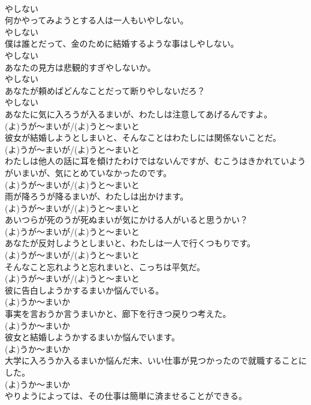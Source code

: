 \documentclass[8pt]{extreport}
\begin{document}
\begin{CJK}{UTF8}{min}
\\	やしない
\\	何かやってみようとする人は一人もいやしない。	
\\	やしない
\\	僕は誰とだって、金のために結婚するような事はしやしない。	
\\	やしない
\\	あなたの見方は悲観的すぎやしないか。	
\\	やしない
\\	あなたが頼めばどんなことだって断りやしないだろ？	
\\	やしない
\\	あなたに気に入ろうが入るまいが、わたしは注意してあげるんですよ。	
\\	(よ)うが～まいが/(よ)うと～まいと
\\	彼女が結婚しようとしまいと、そんなことはわたしには関係ないことだ。	
\\	(よ)うが～まいが/(よ)うと～まいと
\\	わたしは他人の話に耳を傾けたわけではないんですが、むこうはきかれていようがいまいが、気にとめていなかったのです。	
\\	(よ)うが～まいが/(よ)うと～まいと
\\	雨が降ろうが降るまいが、わたしは出かけます。	
\\	(よ)うが～まいが/(よ)うと～まいと
\\	あいつらが死のうが死ぬまいが気にかける人がいると思うかい？	
\\	(よ)うが～まいが/(よ)うと～まいと
\\	あなたが反対しようとしまいと、わたしは一人で行くつもりです。	
\\	(よ)うが～まいが/(よ)うと～まいと
\\	そんなこと忘れようと忘れまいと、こっちは平気だ。	
\\	(よ)うが～まいが/(よ)うと～まいと
\\	彼に告白しようかするまいか悩んでいる。	
\\	(よ)うか～まいか
\\	事実を言おうか言うまいかと、廊下を行きつ戻りつ考えた。	
\\	(よ)うか～まいか
\\	彼女と結婚しようかするまいか悩んでいます。	
\\	(よ)うか～まいか
\\	大学に入ろうか入るまいか悩んだ末、いい仕事が見つかったので就職することにした。	
\\	(よ)うか～まいか
\\	やりようによっては、その仕事は簡単に済ませることができる。	

\end{CJK}
\end{document}
